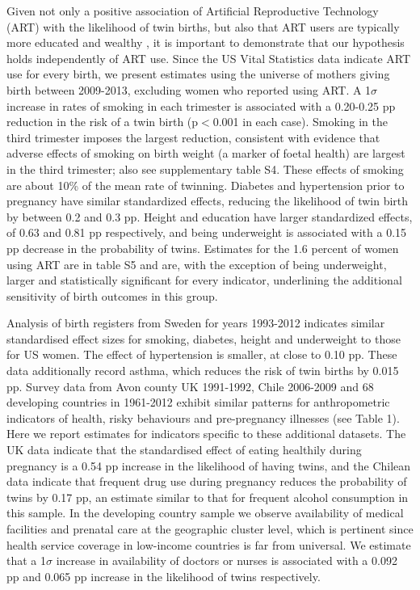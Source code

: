 \documentclass[11pt]{article}
\begin{document}
Given not only a positive association of Artificial Reproductive Technology (ART) with the likelihood of twin births\cite{Vitthalaetal2009}, but also that ART users are typically more educated and wealthy \cite{Lundborgetal2014}, it is important to demonstrate that our hypothesis holds independently of ART use. Since the US Vital Statistics data indicate ART use for every birth, we present estimates using  the universe of mothers giving birth between 2009-2013, excluding women who reported using ART. A 1$\sigma$ increase in rates of smoking in each trimester is associated with a 0.20-0.25 pp reduction in the risk of a twin birth (p$<$0.001 in each case). Smoking in the third trimester imposes the largest reduction, consistent with evidence that adverse effects of smoking on birth weight (a marker of foetal health) are largest in the third trimester\cite{Bernsteinetal2005}; also see supplementary table S4.  These effects of smoking are about 10\% of the mean rate of twinning. Diabetes and hypertension prior to pregnancy have similar standardized effects, reducing the likelihood of twin birth by between 0.2 and 0.3 pp. Height and education have larger standardized effects, of 0.63 and 0.81 pp respectively, and being underweight is associated with a 0.15 pp decrease in the probability of twins. Estimates for the 1.6 percent of women using ART are in table S5 and are, with the exception of being underweight, larger and statistically significant for every indicator, underlining the additional sensitivity of birth outcomes in this group.

Analysis of birth registers from Sweden for years 1993-2012 indicates similar standardised effect sizes for smoking, diabetes, height and underweight to those for US women. The effect of hypertension is smaller, at close to 0.10 pp. These data additionally record asthma, which reduces the risk of twin births by 0.015 pp. Survey data from Avon county UK 1991-1992, Chile 2006-2009 and 68 developing countries in 1961-2012 exhibit similar patterns for anthropometric indicators of health, risky behaviours and pre-pregnancy illnesses (see Table 1). Here we report estimates for indicators specific to these additional datasets. The UK data indicate that the standardised effect of eating healthily during pregnancy is a 0.54 pp increase in the likelihood of having twins, and the Chilean data indicate that frequent drug use during pregnancy reduces the probability of twins by 0.17 pp, an estimate similar to that for frequent alcohol consumption in this sample. In the developing country sample we observe availability of medical facilities and prenatal care at the geographic cluster level, which is pertinent since health service coverage in low-income countries is far from universal. We estimate that a 1$\sigma$ increase in  availability of doctors or nurses is associated with a 0.092 pp and 0.065 pp increase in the likelihood of twins respectively. 
\end{document}
